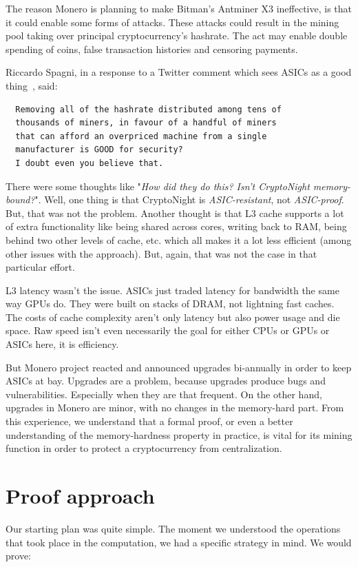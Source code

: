 The reason Monero is planning to make Bitman’s Antminer X3 ineffective, is that it could enable some forms of attacks. These attacks could result in the mining pool taking over principal cryptocurrency’s hashrate. The act may enable double spending of coins, false transaction histories and censoring payments.

Riccardo Spagni, in a response to a Twitter comment which sees ASICs as a good thing~\cite{fluffypony}, said:
\begin{verbatim}
  Removing all of the hashrate distributed among tens of
  thousands of miners, in favour of a handful of miners
  that can afford an overpriced machine from a single
  manufacturer is GOOD for security?
  I doubt even you believe that.
\end{verbatim}

There were some thoughts like "\emph{How did they do this? Isn't CryptoNight memory-bound?}". Well, one thing is that CryptoNight is \emph{ASIC-resistant}, not \emph{ASIC-proof}. But, that was not the problem. Another thought is that L3 cache supports a lot of extra functionality like being shared across cores, writing back to RAM, being behind two other levels of cache, etc. which all makes it a lot less efficient (among other issues with the approach). But, again, that was not the case in that particular effort.

L3 latency wasn't the issue. ASICs just traded latency for bandwidth the same way GPUs do. They were built on stacks of DRAM, not lightning fast caches. The costs of cache complexity aren't only latency but also power usage and die space. Raw speed isn't even necessarily the goal for either CPUs or GPUs or ASICs here, it is efficiency.

But Monero project reacted and announced upgrades bi-annually in order to keep ASICs at bay. Upgrades are a problem, because upgrades produce bugs and vulnerabilities. Especially when they are that frequent. On the other hand, upgrades in Monero are minor, with no changes in the memory-hard part. From this experience, we understand that a formal proof, or even a better understanding of the memory-hardness property in practice, is vital for its mining function in order to protect a cryptocurrency from centralization.

\section{Proof approach}
Our starting plan was quite simple. The moment we understood the operations that took place in the computation, we had a specific strategy in mind. We would prove:

